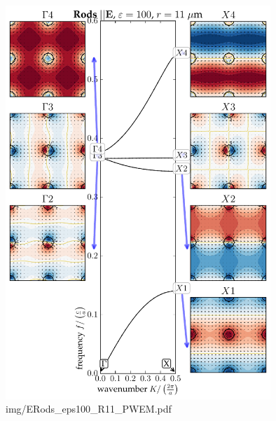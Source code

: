 \begin{figure} \caption{img/ERods\_eps100\_R11\_PWEM.pdf}  \centering \includegraphics[width=10cm]{img/ERods_eps100_R11_PWEM.pdf} \end{figure} 

